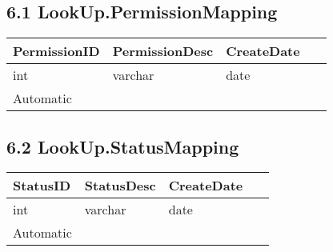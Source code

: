 \documentclass[12pt,fleqn]{article}
\begin{document}
\subsection*{6.1 LookUp.PermissionMapping}
\begin{table}[htbp]
\centering
\footnotesize
\label{DB changes}
    \begin{tabular}{|l|l|l|l|} 
        \hline
        PermissionID & PermissionDesc & CreateDate & ~\\ \hline
        int & varchar & date & ~\\ \hline
        Automatic & ~  & ~ & ~ \\
        \hline  
    \end{tabular}
\end{table}
\FloatBarrier

\subsection*{6.2 LookUp.StatusMapping}
\begin{table}[htbp]
\centering
\footnotesize
\label{DB changes}
    \begin{tabular}{|l|l|l|l|} 
        \hline
        StatusID & StatusDesc & CreateDate & ~\\ \hline
        int & varchar & date & ~\\ \hline
        Automatic & ~  & ~ & ~ \\
        \hline  
    \end{tabular}
\end{table}
\FloatBarrier
\end{document}
